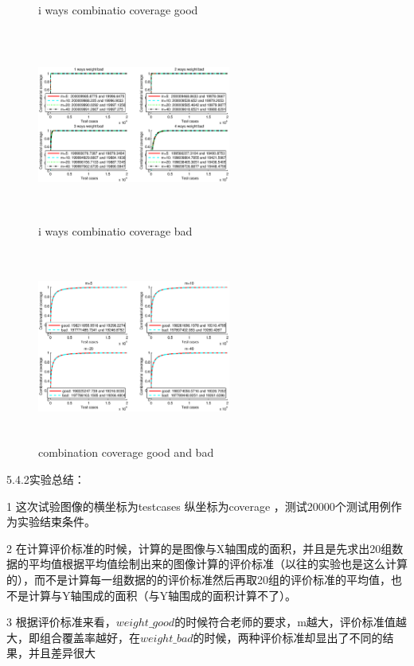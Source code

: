 \documentclass[10pt,journal,letterpaper,compsoc]{IEEEtran}
\begin{document}
\begin{CJK}{UTF8}{gkai}
\begin{figure}[htb]
   \caption{i ways combinatio coverage good}
   \label{fig:ARCH}
 \end{figure}
 \begin{figure}[htb]
   \centering
   \includegraphics[width=2.5in,height=2.5in]{./a1_picture/i_ways_combinatio_coverage_bad.eps}
   \caption{i ways combinatio coverage bad}
   \label{fig:ARCH}
 \end{figure}
 \begin{figure}[htb]
   \centering
   \includegraphics[width=2.5in,height=2.5in]{./a1_picture/combination_coverage_good_and_bad.eps}
   \caption{combination coverage good and bad}
   \label{fig:ARCH}
 \end{figure}

5.4.2实验总结：

1 这次试验图像的横坐标为testcases 纵坐标为coverage ，测试20000个测试用例作为实验结束条件。

2 在计算评价标准的时候，计算的是图像与X轴围成的面积，并且是先求出20组数据的平均值根据平均值绘制出来的图像计算的评价标准（以往的实验也是这么计算的），而不是计算每一组数据的的评价标准然后再取20组的评价标准的平均值，也不是计算与Y轴围成的面积（与Y轴围成的面积计算不了）。

3 根据评价标准来看，$weight\_good$的时候符合老师的要求，m越大，评价标准值越大，即组合覆盖率越好，在$weight\_bad$的时候，两种评价标准却显出了不同的结果，并且差异很大


\end{CJK}
\end{document}
